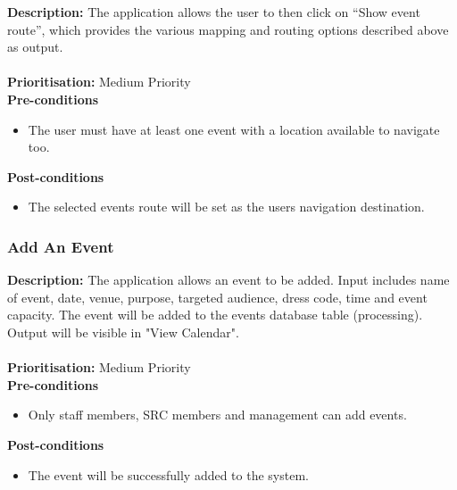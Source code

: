 \documentclass[runningheads,a4paper]{article}
\begin{document}
\textbf{Description:} The application allows the user to then click on “Show event route”, which provides the various mapping and routing options described above as output.\\\\
\noindent
\textbf{Prioritisation:} Medium Priority\\
  
  
\textbf{Pre-conditions}
\begin{itemize}
	\item The user must have at least one event with a location available to navigate too.
\end{itemize}
  
\textbf{Post-conditions}
\begin{itemize}
  	\item The selected events route will be set as the users navigation destination.
\end{itemize}

\subsubsection{Add An Event}

\textbf{Description:} The application allows an event to be added. Input includes name of event, date, venue, purpose, targeted audience, dress code, time and event capacity. The event will be added to the events database table (processing). Output will be visible in "View Calendar".\\\\
\noindent
\textbf{Prioritisation:} Medium Priority\\
  
  
\textbf{Pre-conditions}
\begin{itemize}
	\item Only staff members, SRC members and management can add events.
\end{itemize}
  
\textbf{Post-conditions}
\begin{itemize}
  	\item The event will be successfully added to the system.
\end{itemize}
\end{document}

